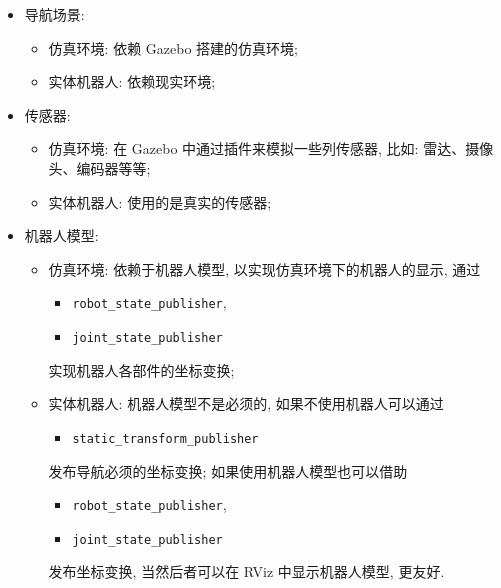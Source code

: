 \documentclass[openany, fontset=windowsold]{ctexbook}
\theoremstyle{kaiti}
\theoremstyle{normal}
\begin{document}
\begin{itemize}
  \item 导航场景:
  \begin{itemize}
    \item 仿真环境: 依赖 Gazebo 搭建的仿真环境;
    \item 实体机器人: 依赖现实环境;
  \end{itemize}
  \item 传感器:
  \begin{itemize}
    \item 仿真环境: 在 Gazebo 中通过插件来模拟一些列传感器, 比如: 雷达、摄像头、编码器等等;
    \item 实体机器人: 使用的是真实的传感器;
  \end{itemize}
  \item 机器人模型:
  \begin{itemize}
    \item 仿真环境: 依赖于机器人模型, 以实现仿真环境下的机器人的显示, 通过 
    \begin{itemize}
      \item \verb|robot_state_publisher|,
      \item \verb|joint_state_publisher|
    \end{itemize}
    实现机器人各部件的坐标变换;
    \item 实体机器人: 机器人模型不是必须的, 如果不使用机器人可以通过 
    \begin{itemize}
      \item \verb|static_transform_publisher|
    \end{itemize}
    发布导航必须的坐标变换; 如果使用机器人模型也可以借助 
    \begin{itemize}
      \item \verb|robot_state_publisher|,
      \item \verb|joint_state_publisher|
    \end{itemize}
    发布坐标变换, 当然后者可以在 RViz 中显示机器人模型, 更友好.
  \end{itemize}
\end{itemize}
\end{document}
